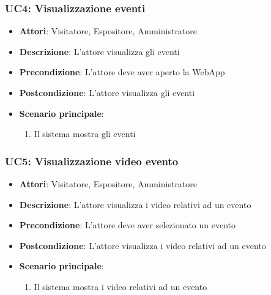 \subsubsection{UC4: Visualizzazione eventi}
\label{subsubsec:uc4}
\begin{itemize}
    \item \textbf{Attori}: Visitatore, Espositore, Amministratore
    \item \textbf{Descrizione}: L'attore visualizza gli eventi
    \item \textbf{Precondizione}: L'attore deve aver aperto la WebApp
    \item \textbf{Postcondizione}: L'attore visualizza gli eventi
    \item \textbf{Scenario principale}:
    \begin{enumerate}
        \item Il sistema mostra gli eventi
    \end{enumerate}
\end{itemize}

\subsubsection{UC5: Visualizzazione video evento}
\label{subsubsec:uc5}
\begin{itemize}
    \item \textbf{Attori}: Visitatore, Espositore, Amministratore
    \item \textbf{Descrizione}: L'attore visualizza i video relativi ad un evento
    \item \textbf{Precondizione}: L'attore deve aver selezionato un evento
    \item \textbf{Postcondizione}: L'attore visualizza i video relativi ad un evento
    \item \textbf{Scenario principale}:
    \begin{enumerate}
        \item Il sistema mostra i video relativi ad un evento
    \end{enumerate}
\end{itemize}


